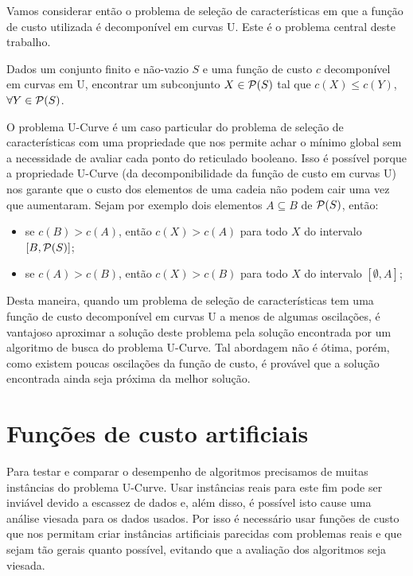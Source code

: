 Vamos considerar então o problema de seleção de características em que a
função de custo utilizada é decomponível em curvas U. Este é o problema 
central deste trabalho.

\begin{mydefinition}
Dados um conjunto finito e não-vazio $S$ e uma função de custo $c$ 
decomponível em curvas em U, encontrar um subconjunto $X \in 
\mathcal{P} (S)$ tal que $c(X) \leq c(Y)$,  $\forall Y \in \mathcal{P} (S)$.
\end{mydefinition}

O problema U-Curve é um caso particular do problema de seleção de 
características com uma propriedade que nos permite achar o mínimo
global sem a necessidade de avaliar cada ponto do reticulado booleano. 
Isso é possível porque a propriedade U-Curve (da decomponibilidade da 
função de custo em curvas U) nos garante que o custo dos elementos de 
uma cadeia não podem cair uma vez que aumentaram. Sejam por exemplo
dois elementos $A \subseteq B$ de $\mathcal{P} (S)$, então:
\begin{itemize}
    \item{se $c(B) > c (A)$, então $c (X) > c (A)$ para todo $X$
        do intervalo $[B, \mathcal{P} (S)]$;}
    \item{se $c(A) > c (B)$, então $c (X) > c (B)$ para todo $X$ 
        do intervalo $[\emptyset, A]$;}
\end{itemize}

Desta maneira, quando um problema de seleção de características tem uma 
função de custo decomponível em curvas U a menos de algumas oscilações,
é vantajoso aproximar a solução deste problema pela solução encontrada
por um algoritmo de busca do problema U-Curve. Tal abordagem não é 
ótima, porém, como existem poucas oscilações da função de custo, é 
provável que a solução encontrada ainda seja próxima da melhor solução.

\section{Funções de custo artificiais}
Para testar e comparar o desempenho de algoritmos precisamos de muitas 
instâncias do problema U-Curve. Usar instâncias reais para este fim pode
ser inviável devido a escassez de dados e, além disso, é possível isto
cause uma análise viesada para os dados usados. Por isso é necessário 
usar funções de custo que nos permitam criar instâncias artificiais 
parecidas com problemas reais e que sejam tão gerais quanto possível, 
evitando que a avaliação dos algoritmos seja viesada. 

